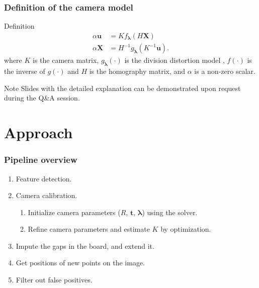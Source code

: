 \documentclass{beamer}
\begin{document}
\begin{frame}
	\frametitle{Definition of the camera model}
	\begin{exampleblock}{Definition}
		\begin{align}
			\alpha \mathbf{u} & = K f_{\boldsymbol{\lambda}}(H\mathbf{X})
			\tag{Projection} \label{eq:projection}                                            \\
			\alpha \mathbf{X} & = H^{-1} g_{\boldsymbol{\lambda}}(K^{-1}\mathbf{u}) \tag{Back
				projection} \label{eq:back_projection}.
		\end{align}
		where \(K\) is the camera matrix, \(g_{\boldsymbol{\lambda}}(\cdot)\) is the division distortion
		model \citep{fitzgibbonSimultaneousLinearEstimation2001}, \(f(\cdot)\) is the
		inverse of \(g(\cdot)\) and \(H\) is the homography matrix, and \(\alpha\)
		is a non-zero scalar.
	\end{exampleblock}

	\begin{alertblock}{Note}
		Slides with the detailed explanation can be demonstrated upon request during the Q\&A session.
	\end{alertblock}

\end{frame}

\section{Approach}\label{sec:approach}

\begin{frame}
	\frametitle{Pipeline overview}

	\begin{enumerate}
		\item Feature detection.
		\item Camera calibration.
		      \begin{enumerate}
			      \item Initialize camera parameters (\(R\), \(\mathbf{t}\),
			            \(\boldsymbol{\lambda}\)) using the solver.
			      \item Refine camera parameters and estimate \(K\) by optimization.
		      \end{enumerate}
		\item Impute the gaps in the board, and extend it.
		\item Get positions of new points on the image.
		\item Filter out false positives.
	\end{enumerate}
\end{frame}
\end{document}
